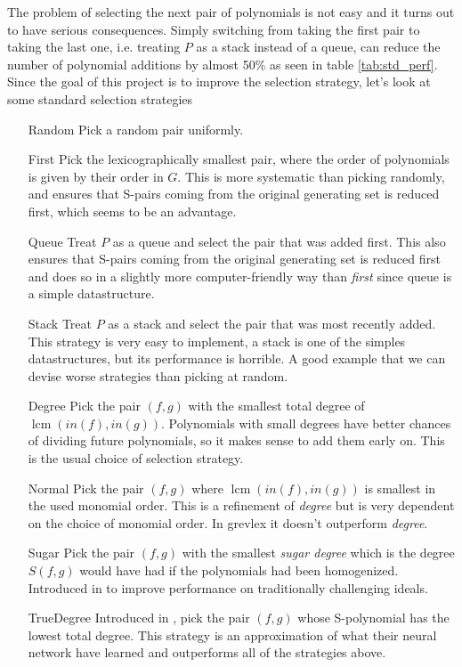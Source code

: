 \documentclass{article}
\theoremstyle{changedot}
\theoremstyle{changedotbreak}
\theoremstyle{nonumberplain}
\DeclareMathOperator{\lcm}{lcm}
\begin{document}
The problem of selecting the next pair of polynomials is not easy and it turns out to have serious consequences. Simply switching from taking the first pair to taking the last one, i.e. treating $P$ as a stack instead of a queue, can reduce the number of polynomial additions by almost 50\% as seen in table \ref{tab:std_perf}. Since the goal of this project is to improve the selection strategy, let's look at some standard selection strategies

\begin{itemize}
  \item[Random] Pick a random pair uniformly.

  \item[First] Pick the lexicographically smallest pair, where the order of polynomials is given by their order in $G$. This is more systematic than picking randomly, and ensures that S-pairs coming from the original generating set is reduced first, which seems to be an advantage.

  \item[Queue] Treat $P$ as a queue and select the pair that was added first. This also ensures that S-pairs coming from the original generating set is reduced first and does so in a slightly more computer-friendly way than \emph{first} since queue is a simple datastructure.

  \item[Stack] Treat $P$ as a stack and select the pair that was most recently added. This strategy is very easy to implement, a stack is one of the simples datastructures, but its performance is horrible. A good example that we can devise worse strategies than picking at random.

  \item[Degree] Pick the pair $(f, g)$ with the smallest total degree of $\lcm(in(f), in(g))$. Polynomials with small degrees have better chances of dividing future polynomials, so it makes sense to add them early on. This is the usual choice of selection strategy.

  \item[Normal] Pick the pair $(f, g)$ where $\lcm(in(f), in(g))$ is smallest in the used monomial order. This is a refinement of \emph{degree} but is very dependent on the choice of monomial order. In grevlex it doesn't outperform \emph{degree}.

  \item[Sugar] Pick the pair $(f, g)$ with the smallest \emph{sugar degree} which is the degree $S(f, g)$ would have had if the polynomials had been homogenized. Introduced in \cite{sugar} to improve performance on traditionally challenging ideals. 

  \item[TrueDegree] Introduced in \cite{peifer}, pick the pair $(f, g)$ whose S-polynomial has the lowest total degree. This strategy is an approximation of what their neural network have learned and outperforms all of the strategies above.
\end{itemize}
\end{document}
